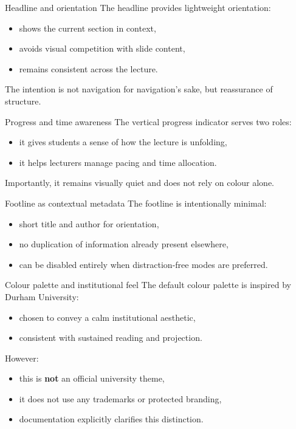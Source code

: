 \documentclass[aspectratio=169]{beamer}
\begin{document}
\begin{frame}{Headline and orientation}
The headline provides lightweight orientation:
\begin{itemize}
  \item shows the current section in context,
  \item avoids visual competition with slide content,
  \item remains consistent across the lecture.
\end{itemize}

\vspace{0.6em}
The intention is not navigation for navigation’s sake, but reassurance of structure.
\end{frame}

\begin{frame}{Progress and time awareness}
The vertical progress indicator serves two roles:
\begin{itemize}
  \item it gives students a sense of how the lecture is unfolding,
  \item it helps lecturers manage pacing and time allocation.
\end{itemize}

\vspace{0.6em}
Importantly, it remains visually quiet and does not rely on colour alone.
\end{frame}

\begin{frame}{Footline as contextual metadata}
The footline is intentionally minimal:
\begin{itemize}
  \item short title and author for orientation,
  \item no duplication of information already present elsewhere,
  \item can be disabled entirely when distraction-free modes are preferred.
\end{itemize}
\end{frame}

\begin{frame}{Colour palette and institutional feel}
The default colour palette is inspired by Durham University:
\begin{itemize}
  \item chosen to convey a calm institutional aesthetic,
  \item consistent with sustained reading and projection.
\end{itemize}

\vspace{0.6em}
However:
\begin{itemize}
  \item this is \textbf{not} an official university theme,
  \item it does not use any trademarks or protected branding,
  \item documentation explicitly clarifies this distinction.
\end{itemize}
\end{frame}
\end{document}

